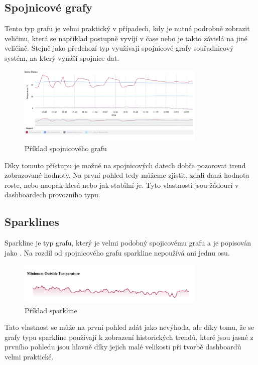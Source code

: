 \subsection*{Spojnicové  grafy}
Tento typ grafu je velmi praktický v případech, kdy je nutné podrobně zobrazit veličinu, která se například postupně vyvíjí v čase nebo je takto závislá na jiné veličině. Stejně jako předchozí typ využívají spojnicové grafy souřadnicový systém, na který vynáší spojnice dat. 
\begin{figure}[H]
\label{question4}
\begin{center}
    \includegraphics[width=0.8\textwidth]{obrazky-figures/line.pdf}
\end{center}
\caption{Příklad spojnicového grafu}
\end{figure}
Díky tomuto přístupu je možné na spojnicových datech dobře pozorovat trend zobrazované hodnoty. Na první pohled tedy můžeme zjistit, zdali daná hodnota roste, nebo naopak klesá nebo jak stabilní je. Tyto vlastnosti jsou žádoucí v dashboardech provozního typu.

\subsection*{Sparklines}
Sparkline je typ grafu, který je velmi podobný spojicovému grafu a je popisován jako . Na rozdíl od spojnicového grafu sparkline nepoužívá ani jednu osu. 
\begin{figure}[H]
\label{question4}
\begin{center}
    \includegraphics[width=0.8\textwidth]{obrazky-figures/sparkline.pdf}
\end{center}
\caption{Příklad sparkline}
\end{figure}
Tato vlastnost se může na první pohled zdát jako nevýhoda, ale díky tomu, že se grafy typu sparkline používají k zobrazení historických trendů, které jsou jasné z prvního pohledu jsou hlavně díky jejich malé velikosti při tvorbě dashboardů velmi praktické.


